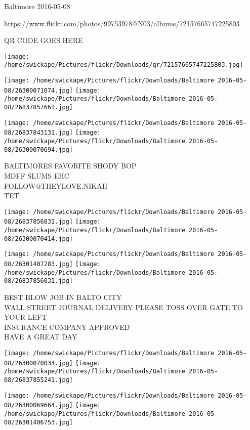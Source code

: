 \documentclass[10pt,letterpaper]{article}
\begin{document}
Baltimore 2016-05-08

https://www.flickr.com/photos/99753978@N03/albums/72157665747225803

QR CODE GOES HERE

\texttt{[image: /home/swickape/Pictures/flickr/Downloads/qr/72157665747225803.jpg]}
\pagebreak

\texttt{[image: /home/swickape/Pictures/flickr/Downloads/Baltimore 2016-05-08/26300071074.jpg]}
\texttt{[image: /home/swickape/Pictures/flickr/Downloads/Baltimore 2016-05-08/26837857661.jpg]}

\texttt{[image: /home/swickape/Pictures/flickr/Downloads/Baltimore 2016-05-08/26837843131.jpg]}
\texttt{[image: /home/swickape/Pictures/flickr/Downloads/Baltimore 2016-05-08/26300070694.jpg]}

BALTIMORES FAVORITE SHODY BOP\\
MDFF SLUMS EHC\\
FOLLOW@THEYLOVE.NIKAH\\
TET\\
\pagebreak

\texttt{[image: /home/swickape/Pictures/flickr/Downloads/Baltimore 2016-05-08/26837856831.jpg]}
\texttt{[image: /home/swickape/Pictures/flickr/Downloads/Baltimore 2016-05-08/26300070414.jpg]}

\texttt{[image: /home/swickape/Pictures/flickr/Downloads/Baltimore 2016-05-08/26301407283.jpg]}
\texttt{[image: /home/swickape/Pictures/flickr/Downloads/Baltimore 2016-05-08/26837856031.jpg]}

BEST BLOW JOB IN BALTO CITY\\
WALL STREET JOURNAL DELIVERY PLEASE TOSS OVER GATE TO YOUR LEFT\\
INSURANCE COMPANY APPROVED\\
HAVE A GREAT DAY\\
\pagebreak

\texttt{[image: /home/swickape/Pictures/flickr/Downloads/Baltimore 2016-05-08/26300070034.jpg]}
\texttt{[image: /home/swickape/Pictures/flickr/Downloads/Baltimore 2016-05-08/26837855241.jpg]}

\texttt{[image: /home/swickape/Pictures/flickr/Downloads/Baltimore 2016-05-08/26300069664.jpg]}
\texttt{[image: /home/swickape/Pictures/flickr/Downloads/Baltimore 2016-05-08/26301406753.jpg]}
\end{document}
